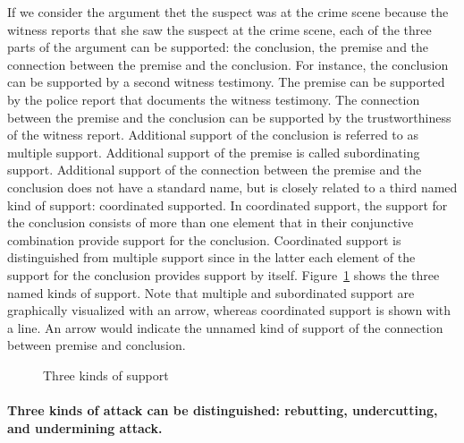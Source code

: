 \documentclass[10pt]{article}
\begin{document}
If we consider the argument thet the suspect was at the crime scene because the witness reports that she saw the suspect at the crime scene, each of the three parts of the argument can be supported: the conclusion, the premise and the connection between the premise and the conclusion. For instance, the conclusion can be supported by a second witness testimony. The premise can be supported by the police report that documents the witness testimony. The connection between the premise and the conclusion can be supported by the trustworthiness of the witness report. Additional support of the conclusion is referred to as multiple support. Additional support of the premise is called subordinating support. Additional support of the connection between the premise and the conclusion does not have a standard name, but is closely related to a third named kind of support: coordinated supported. In coordinated support, the support for the conclusion consists of more than one element that in their conjunctive combination provide support for the conclusion. Coordinated support is distinguished from multiple support since in the latter each element of the support for the conclusion provides support by itself. Figure~\ref{fig:support} shows the three named kinds of support. Note that multiple and subordinated support are graphically visualized with an arrow, whereas coordinated support is shown with a line. An arrow would indicate the unnamed kind of support of the connection between premise and conclusion.

\begin{figure}[bt]
\centering

\caption{Three kinds of support\label{fig:support}}
\end{figure}



\paragraph{Three kinds of attack can be distinguished: rebutting, undercutting, and undermining attack.}
\end{document}
